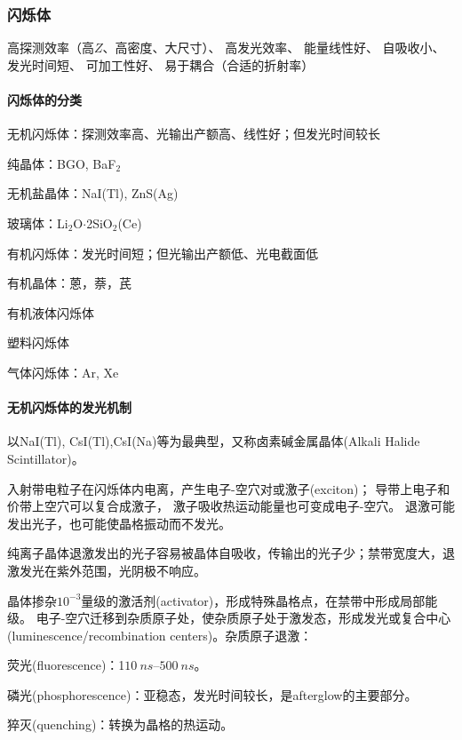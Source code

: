 \subsubsection{闪烁体}
高探测效率（高$Z$、高密度、大尺寸）、
高发光效率、
能量线性好、
自吸收小、
发光时间短、
可加工性好、
易于耦合（合适的折射率）
\paragraph{闪烁体的分类}
\begin{compactitem}
	\item 无机闪烁体：探测效率高、光输出产额高、线性好；但发光时间较长
	\begin{compactitem}
		\item 纯晶体：BGO, BaF$_2$
		\item 无机盐晶体：NaI(Tl), ZnS(Ag)
		\item 玻璃体：Li$_2$O$·$2SiO$_2$(Ce)
	\end{compactitem}
	\item 有机闪烁体：发光时间短；但光输出产额低、光电截面低
	\begin{compactitem}
		\item 有机晶体：蒽，萘，芪
		\item 有机液体闪烁体
		\item 塑料闪烁体
	\end{compactitem}
	\item 气体闪烁体：Ar, Xe
\end{compactitem}
\paragraph{无机闪烁体的发光机制}
以NaI(Tl), CsI(Tl),CsI(Na)等为最典型，又称卤素碱金属晶体(Alkali Halide Scintillator)。

入射带电粒子在闪烁体内电离，产生电子-空穴对或激子(exciton)；
导带上电子和价带上空穴可以复合成激子，
激子吸收热运动能量也可变成电子-空穴。
退激可能发出光子，也可能使晶格振动而不发光。

纯离子晶体退激发出的光子容易被晶体自吸收，传输出的光子少；禁带宽度大，退激发光在紫外范围，光阴极不响应。

晶体掺杂$10^{-3}$量级的激活剂(activator)，形成特殊晶格点，在禁带中形成局部能级。
电子-空穴迁移到杂质原子处，使杂质原子处于激发态，形成发光或复合中心(luminescence/recombination centers)。杂质原子退激：
\begin{compactitem}
	\item 荧光(fluorescence)：1$\SIrange{10}{500}{ns}$。
	\item 磷光(phosphorescence)：亚稳态，发光时间较长，是afterglow的主要部分。
	\item 猝灭(quenching)：转换为晶格的热运动。
\end{compactitem}

